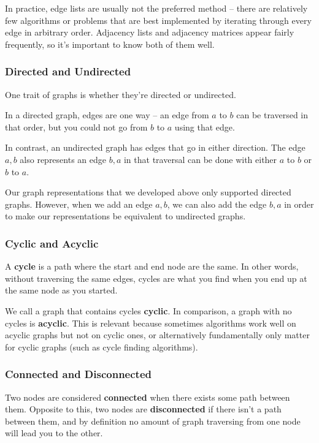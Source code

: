 In practice, edge lists are usually not the preferred method -- there are relatively few algorithms or problems that are best implemented by iterating through every edge in arbitrary order. Adjacency lists and adjacency matrices appear fairly frequently, so it's important to know both of them well.

\subsubsection{Directed and Undirected}

One trait of graphs is whether they're directed or undirected.

In a directed graph, edges are one way -- an edge from $a$ to $b$ can be traversed in that order, but you could not go from $b$ to $a$ using that edge.

In contrast, an undirected graph has edges that go in either direction. The edge $a,b$ also represents an edge $b,a$ in that traversal can be done with either $a$ to $b$ or $b$ to $a$.

Our graph representations that we developed above only supported directed graphs. However, when we add an edge $a,b$, we can also add the edge $b,a$ in order to make our representations be equivalent to undirected graphs.

\subsubsection{Cyclic and Acyclic}

A \textbf{cycle} is a path where the start and end node are the same. In other words, without traversing the same edges, cycles are what you find when you end up at the same node as you started.

We call a graph that contains cycles \textbf{cyclic}. In comparison, a graph with no cycles is \textbf{acyclic}. This is relevant because sometimes algorithms work well on acyclic graphs but not on cyclic ones, or alternatively fundamentally only matter for cyclic graphs (such as cycle finding algorithms).

\subsubsection{Connected and Disconnected}

Two nodes are considered \textbf{connected} when there exists some path between them. Opposite to this, two nodes are \textbf{disconnected} if there isn't a path between them, and by definition no amount of graph traversing from one node will lead you to the other.

